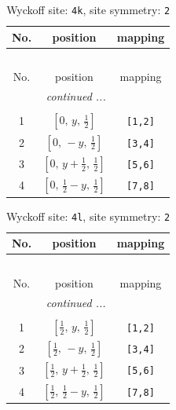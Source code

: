 \documentclass[fleqn,8pt]{jsarticle}
\begin{document}
\renewcommand{\arraystretch}{1.2}
\begin{longtable}{ccc}
\caption{Wyckoff site: {\tt 4k}, site symmetry: {\tt 2}}
 \\
 \hline \hline
No. & position & mapping \\ \hline \endfirsthead

\multicolumn{2}{l}{\tablename\ \thetable{}} \\
 \hline \hline
No. & position & mapping \\ \hline \endhead

 \hline \hline
\multicolumn{2}{r}{\footnotesize\it continued ...} \\ \endfoot

 \hline \hline
\multicolumn{2}{r}{} \\ \endlastfoot

1 & $\left[ 0,\, y,\, \frac{1}{2} \right]$ & {\tt [1,2]} \\ \hline
2 & $\left[ 0,\, - y,\, \frac{1}{2} \right]$ & {\tt [3,4]} \\ \hline
3 & $\left[ 0,\, y + \frac{1}{2},\, \frac{1}{2} \right]$ & {\tt [5,6]} \\ \hline
4 & $\left[ 0,\, \frac{1}{2} - y,\, \frac{1}{2} \right]$ & {\tt [7,8]} \\
\end{longtable}
\renewcommand{\arraystretch}{1.2}
\begin{longtable}{ccc}
\caption{Wyckoff site: {\tt 4l}, site symmetry: {\tt 2}}
 \\
 \hline \hline
No. & position & mapping \\ \hline \endfirsthead

\multicolumn{2}{l}{\tablename\ \thetable{}} \\
 \hline \hline
No. & position & mapping \\ \hline \endhead

 \hline \hline
\multicolumn{2}{r}{\footnotesize\it continued ...} \\ \endfoot

 \hline \hline
\multicolumn{2}{r}{} \\ \endlastfoot

1 & $\left[ \frac{1}{2},\, y,\, \frac{1}{2} \right]$ & {\tt [1,2]} \\ \hline
2 & $\left[ \frac{1}{2},\, - y,\, \frac{1}{2} \right]$ & {\tt [3,4]} \\ \hline
3 & $\left[ \frac{1}{2},\, y + \frac{1}{2},\, \frac{1}{2} \right]$ & {\tt [5,6]} \\ \hline
4 & $\left[ \frac{1}{2},\, \frac{1}{2} - y,\, \frac{1}{2} \right]$ & {\tt [7,8]} \\
\end{longtable}
\end{document}
